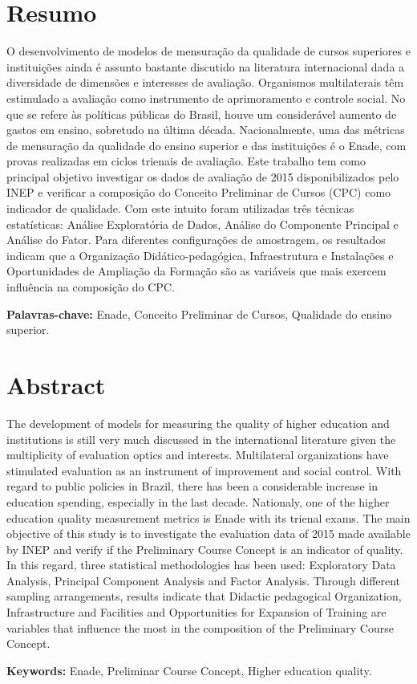 
\section*{Resumo}

O desenvolvimento de modelos de mensuração da qualidade de cursos superiores e instituições ainda é assunto bastante discutido na literatura internacional dada a diversidade de dimensões e interesses de avaliação. Organismos multilaterais têm estimulado a avaliação como instrumento de aprimoramento e controle social. No que se refere às políticas públicas do Brasil, houve um considerável aumento de gastos em ensino, sobretudo na última década. Nacionalmente, uma das métricas de mensuração da qualidade do ensino superior e das instituições é o Enade, com provas realizadas em ciclos trienais de avaliação. Este trabalho tem como principal objetivo investigar os dados de avaliação de 2015 disponibilizados pelo INEP e verificar a composição do Conceito Preliminar de Cursos (CPC) como indicador de qualidade. Com este intuito foram utilizadas três técnicas estatísticas: Análise Exploratória de Dados, Análise do Componente Principal e Análise do Fator. Para diferentes configurações de amostragem, os resultados indicam que a Organização Didático-pedagógica, Infraestrutura e Instalações e Oportunidades de Ampliação da Formação são as variáveis que mais exercem influência na composição do CPC.

\textbf{Palavras-chave:} Enade, Conceito Preliminar de Cursos, Qualidade do ensino superior.

\section*{Abstract}

The development of models for measuring the quality of higher education and institutions is still very much discussed in the international literature given the multiplicity of evaluation optics and interests. Multilateral organizations have stimulated evaluation as an instrument of improvement and social control. With regard to public policies in Brazil, there has been a considerable increase in education spending, especially in the last decade. Nationaly, one of the higher education quality measurement metrics is Enade with its trienal exams. The main objective of this study is to investigate the evaluation data of 2015 made available by INEP and verify if the Preliminary Course Concept is an indicator of quality. In this regard, three statistical methodologies has been used: Exploratory Data Analysis, Principal Component Analysis and Factor Analysis. Through different sampling arrangements, results indicate that Didactic pedagogical Organization, Infrastructure and Facilities and Opportunities for Expansion of Training are variables that influence the most in the composition of the Preliminary Course Concept.

\textbf{Keywords:} Enade, Preliminar Course Concept, Higher education quality.
\pagebreak